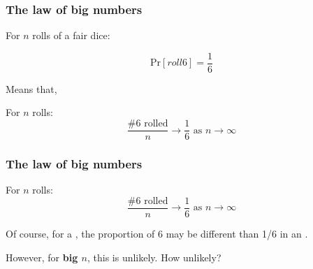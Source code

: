 \documentclass{beamer}
\begin{document}
\begin{frame}
  \frametitle{The law of big numbers}

  {\larger
  
  For $n$ rolls of a fair dice:

  \bigskip
  
  \begin{equation*}
    \text{Pr}[roll 6] = \frac{1}{6}
  \end{equation*}

  \bigskip
  
  Means that, 

  \vfill

  For $n$ rolls:
  \begin{equation*}
    \frac{\text{\# 6 rolled}}{n} \to \frac{1}{6} \text{ as } n \to \infty
  \end{equation*}
  }
\end{frame}

\begin{frame}
  \frametitle{The law of big numbers}

  {\larger

  For $n$ rolls:
  \begin{equation*}
    \frac{\text{\# 6 rolled}}{n} \to \frac{1}{6} \text{ as } n \to \infty
  \end{equation*}
  

  \vfill

  Of course, for a , the proportion of 6
  may be different than 1/6 in an .

  \bigskip

  However, for {\bf big $n$}, this is \alert{unlikely}. How unlikely?
  
  }
\end{frame}
\end{document}
